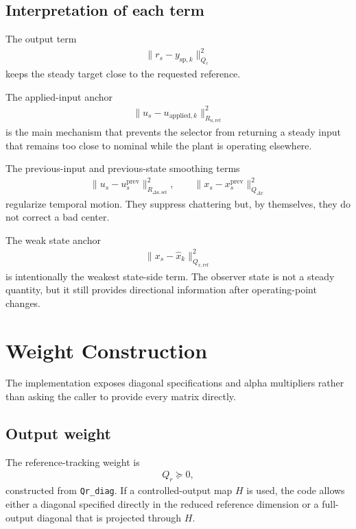 \documentclass[11pt]{article}
\begin{document}
\subsection{Interpretation of each term}
The output term
\begin{align}
\|r_s - y_{\mathrm{sp},k}\|_{Q_r}^2
\end{align}
keeps the steady target close to the requested reference.

The applied-input anchor
\begin{align}
\|u_s - u_{\mathrm{applied},k}\|_{R_{u,\mathrm{ref}}}^2
\end{align}
is the main mechanism that prevents the selector from returning a steady input that remains too close to nominal while the plant is operating elsewhere.

The previous-input and previous-state smoothing terms
\begin{align}
\|u_s - u_s^{\mathrm{prev}}\|_{R_{\Delta u,\mathrm{sel}}}^2,
\qquad
\|x_s - x_s^{\mathrm{prev}}\|_{Q_{\Delta x}}^2
\end{align}
regularize temporal motion. They suppress chattering but, by themselves, they do not correct a bad center.

The weak state anchor
\begin{align}
\|x_s - \hat x_k\|_{Q_{x,\mathrm{ref}}}^2
\end{align}
is intentionally the weakest state-side term. The observer state is not a steady quantity, but it still provides directional information after operating-point changes.

\section{Weight Construction}
The implementation exposes diagonal specifications and alpha multipliers rather than asking the caller to provide every matrix directly.

\subsection{Output weight}
The reference-tracking weight is
\begin{align}
Q_r \succeq 0,
\end{align}
constructed from \texttt{Qr\_diag}. If a controlled-output map $H$ is used, the code allows either a diagonal specified directly in the reduced reference dimension or a full-output diagonal that is projected through $H$.
\end{document}
